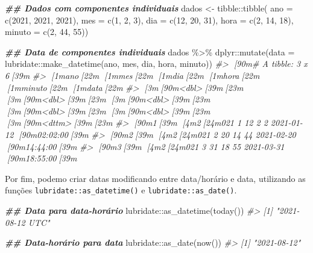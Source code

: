 \documentclass[
]{book}
\newenvironment{Shaded}{\begin{snugshade}}{\end{snugshade}}
\newcommand{\AttributeTok}[1]{\textcolor[rgb]{0.61,0.61,0.61}{#1}}
\newcommand{\CommentTok}[1]{\textcolor[rgb]{0.37,0.37,0.37}{\textit{#1}}}
\newcommand{\DecValTok}[1]{\textcolor[rgb]{0.06,0.06,0.06}{#1}}
\newcommand{\DocumentationTok}[1]{\textcolor[rgb]{0.37,0.37,0.37}{\textbf{\textit{#1}}}}
\newcommand{\FunctionTok}[1]{\textcolor[rgb]{0,0,0}{#1}}
\newcommand{\NormalTok}[1]{#1}
\newcommand{\OtherTok}[1]{\textcolor[rgb]{0.37,0.37,0.37}{#1}}
\newcommand{\SpecialCharTok}[1]{\textcolor[rgb]{0,0,0}{#1}}
\begin{document}
\begin{Shaded}
\begin{Highlighting}[]
\DocumentationTok{\#\# Dados com componentes individuais}
\NormalTok{dados }\OtherTok{\textless{}{-}}\NormalTok{ tibble}\SpecialCharTok{::}\FunctionTok{tibble}\NormalTok{(}
  \AttributeTok{ano =} \FunctionTok{c}\NormalTok{(}\DecValTok{2021}\NormalTok{, }\DecValTok{2021}\NormalTok{, }\DecValTok{2021}\NormalTok{),}
  \AttributeTok{mes =} \FunctionTok{c}\NormalTok{(}\DecValTok{1}\NormalTok{, }\DecValTok{2}\NormalTok{, }\DecValTok{3}\NormalTok{),}
  \AttributeTok{dia =} \FunctionTok{c}\NormalTok{(}\DecValTok{12}\NormalTok{, }\DecValTok{20}\NormalTok{, }\DecValTok{31}\NormalTok{),}
  \AttributeTok{hora =} \FunctionTok{c}\NormalTok{(}\DecValTok{2}\NormalTok{, }\DecValTok{14}\NormalTok{, }\DecValTok{18}\NormalTok{), }
  \AttributeTok{minuto =} \FunctionTok{c}\NormalTok{(}\DecValTok{2}\NormalTok{, }\DecValTok{44}\NormalTok{, }\DecValTok{55}\NormalTok{))}

\DocumentationTok{\#\# Data de componentes individuais}
\NormalTok{dados }\SpecialCharTok{\%\textgreater{}\%} 
\NormalTok{  dplyr}\SpecialCharTok{::}\FunctionTok{mutate}\NormalTok{(}\AttributeTok{data =}\NormalTok{ lubridate}\SpecialCharTok{::}\FunctionTok{make\_datetime}\NormalTok{(ano, mes, dia, hora, minuto))}
\CommentTok{\#\textgreater{} [90m\# A tibble: 3 x 6[39m}
\CommentTok{\#\textgreater{}     [1mano[22m   [1mmes[22m   [1mdia[22m  [1mhora[22m [1mminuto[22m [1mdata[22m               }
\CommentTok{\#\textgreater{}   [3m[90m\textless{}dbl\textgreater{}[39m[23m [3m[90m\textless{}dbl\textgreater{}[39m[23m [3m[90m\textless{}dbl\textgreater{}[39m[23m [3m[90m\textless{}dbl\textgreater{}[39m[23m  [3m[90m\textless{}dbl\textgreater{}[39m[23m [3m[90m\textless{}dttm\textgreater{}[39m[23m             }
\CommentTok{\#\textgreater{} [90m1[39m  [4m2[24m021     1    12     2      2 2021{-}01{-}12 [90m02:02:00[39m}
\CommentTok{\#\textgreater{} [90m2[39m  [4m2[24m021     2    20    14     44 2021{-}02{-}20 [90m14:44:00[39m}
\CommentTok{\#\textgreater{} [90m3[39m  [4m2[24m021     3    31    18     55 2021{-}03{-}31 [90m18:55:00[39m}
\end{Highlighting}
\end{Shaded}

Por fim, podemo criar datas modificando entre data/horário e data, utilizando as funções \texttt{lubridate::as\_datetime()} e \texttt{lubridate::as\_date()}.

\begin{Shaded}
\begin{Highlighting}[]
\DocumentationTok{\#\# Data para data{-}horário}
\NormalTok{lubridate}\SpecialCharTok{::}\FunctionTok{as\_datetime}\NormalTok{(}\FunctionTok{today}\NormalTok{())}
\CommentTok{\#\textgreater{} [1] "2021{-}08{-}12 UTC"}

\DocumentationTok{\#\# Data{-}horário para data}
\NormalTok{lubridate}\SpecialCharTok{::}\FunctionTok{as\_date}\NormalTok{(}\FunctionTok{now}\NormalTok{())}
\CommentTok{\#\textgreater{} [1] "2021{-}08{-}12"}
\end{Highlighting}
\end{Shaded}
\end{document}
